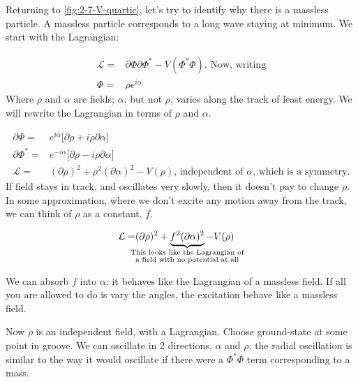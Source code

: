\documentclass[]{article}
\begin{document}
Returning to \ref{fig:2-7-V-quartic}, let's try to identify why there is a massless particle. A massless particle corresponds to a long wave staying at minimum. We start with the Lagrangian:

\begin{align*}
	\mathcal{L} =& \partial \Phi \partial \Phi^* - V(\Phi^*\Phi) \text{. Now, writing}\\
	\Phi =& \rho e^{i \alpha}
\end{align*}
Where $\rho$ and $\alpha$ are fields;  $\alpha$, but not $\rho$, varies along the track of least energy. We will rewrite the Lagrangian in terms of $\rho$ and $\alpha$.

\begin{align*}
	\partial \Phi =& e^{i \alpha} \big[\partial \rho + i \rho \partial \alpha\big] \\
	\partial \Phi^* =& e^{-i \alpha} \big[\partial \rho - i \rho \partial \alpha\big]\\
	\mathcal{L} =& (\partial \rho)^2 + \rho^2  (\partial \alpha)^2 - V(\rho) \text{, independent of $\alpha$, which is a symmetry.} 
\end{align*}
If field stays in track, and oscillates very slowly, then it doesn't pay to change $\rho$. In some approximation, where we don't excite any motion away from the track, we can think of $\rho$ as a constant, $f$.

\begin{align*}
	\mathcal{L} =& (\partial \rho)^2 + \underbrace{f^2(\partial \alpha)^2 }_{\mathclap{\substack{\text{This looks like the Lagrangian of}\\ \text{a field with no potential at all}}}}  - V(\rho)
\end{align*}

We can absorb $f$ into $\alpha$: it behaves like the Lagrangian of a massless field. If all you are allowed to do is vary the angles, the excitation behave like a massless field.

Now $\rho$ is an independent field, with a Lagrangian.
Choose ground-state at some point in groove. We can oscillate in 2 directions, $\alpha$ and $\rho$: the radial oscillation is similar to the way it would oscillate if there were a $\Phi^*\Phi$ term corresponding to a mass.
\end{document}
